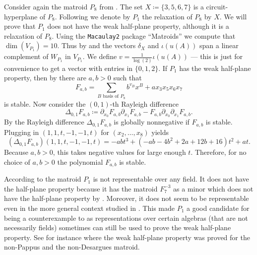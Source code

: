 \documentclass[11pt]{article}
\theoremstyle{definition}
\numberwithin{equation}{section}
\begin{document}
\begin{ex}\label{ex:counterrelax}
    Consider again the matroid $P_8$ from . The set $X\coloneqq \{3,5,6,7\}$ is a circuit-hyperplane of $P_8$. Following \cite{ninematroids} we denote by $P_1$ the relaxation of $P_8$ by $X$. We will prove that $P_1$ does not have the weak half-plane property, although it is a relaxation of $P_8$.    
    Using the {\texttt{Macaulay2}} \cite{M2} package ``Matroids'' \cite{MatroidsArticle} we compute that $\dim(V_{P_1})=10$. Thus by  and  the vectors $\delta_X$ and $\iota(u(A))$ span a linear complement of $W_{P_1}$ in $V_{P_1}$. We define $v=\frac{1}{\log(2)}\iota(u(A))$ --- this is just for convenience to get a vector with entries in $\{0,1,2\}$. If $P_1$ has the weak half-plane property, then by  there are $a,b>0$ such that
    \begin{equation*}
        F_{a,b}=\sum_{B\text{ basis of }P_8}b^{v_B}x^B+ax_3x_5x_6x_7
    \end{equation*}
    is stable. Now consider the $(0,1)$-th Rayleigh difference
    \begin{equation*}
      \Delta_{0,1}F_{a,b}\coloneqq \partial_{x_0}F_{a,b}\partial_{x_1}F_{a,b}-F_{a,b}\partial_{x_0}\partial_{x_1}F_{a,b}.  
    \end{equation*}
    By \cite[Theorem~5.10]{BrandenHPP} the Rayleigh difference $\Delta_{0,1}F_{a,b}$ is globally nonnegative if $F_{a,b}$ is stable. Plugging in $(1,1,t,-1,-1,t)$ for $(x_2,\ldots,x_8)$ yields
    \begin{equation*}
      (\Delta_{0,1}F_{a,b})(1,1,t,-1,-1,t)=-abt^3+(-ab-4b^2+2a+12b+16)t^2+at.  
    \end{equation*}
     Because $a,b>0$, this takes negative values for large enough $t$. Therefore, for no choice of $a,b>0$ the polynomial $F_{a,b}$ is stable.
    
\end{ex}

\begin{rem}
    According to \cite[Proposition~4]{ninematroids} the matroid $P_1$ is not representable over any field. It does not have the half-plane property because it has the matroid $F_7^{-3}$ as a minor which does not have the half-plane property by \cite[Example~11.7]{HPPlong}. Moreover, it does not seem to be representable even in the more general context studied in \cite{skewpartial}. This made $P_1$ a good candidate for being a counterexample to  as representations over certain algebras (that are not necessarily fields) sometimes can still be used to prove the weak half-plane property. See for instance \cite{NonPappus} where the weak half-plane property was proved for the non-Pappus and  the non-Desargues matroid.
\end{rem}
\end{document}
